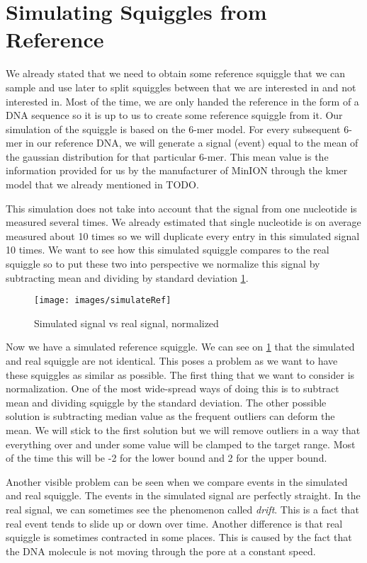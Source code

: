 \section{Simulating Squiggles from Reference}

We already stated that we need to obtain some reference squiggle that we
can sample and use later to split squiggles between that we are interested in and not
interested in. Most of the time, we are only handed the reference in the form of a DNA sequence
so it is up to us to create some reference squiggle from it. Our simulation of the squiggle is based on the 6-mer model.
For every subsequent 6-mer in our reference DNA, we will generate a signal (event) equal to
the mean of the gaussian distribution for that particular 6-mer. This mean value
is the information provided for us by the manufacturer of MinION through the kmer model
that we already mentioned in TODO.

This simulation does not take into account that the signal from one nucleotide is
measured several times. We already estimated that single nucleotide is on average
measured about 10 times so we will duplicate every entry in this simulated signal
10 times. We want to see how this simulated squiggle compares to the real squiggle
so to put these two into perspective we normalize this signal by subtracting mean
and dividing by standard deviation \ref{obr:simVsReal}.

\begin{figure}
\centerline{\texttt{[image: images/simulateRef]}}
\caption[TODO]{Simulated signal vs real signal, normalized}
\label{obr:simVsReal}
\end{figure}

Now we have a simulated reference squiggle. We can see on \ref{obr:simVsReal} that the simulated and real
squiggle are not identical. This poses a problem as we want to have these squiggles as
similar as possible. The first thing that we want to consider is normalization.
One of the most wide-spread ways of doing this is to subtract mean and dividing
squiggle by the standard deviation. The other possible solution is subtracting median value
as the frequent outliers can deform the mean. We will stick to the first solution
but we will remove outliers in a way that everything over and under some value will
be clamped to the target range. Most of the time this will be -2 for the lower bound
and 2 for the upper bound.

Another visible problem can be seen when we compare events in the simulated and real squiggle.
The events in the simulated signal are perfectly straight. In the real signal, we can sometimes see
the phenomenon called \textit{drift}. This is a fact that real event tends to slide
up or down over time. Another difference is that real squiggle
is sometimes contracted in some places. This is caused by the fact that the DNA
molecule is not moving through the pore at a constant speed.

